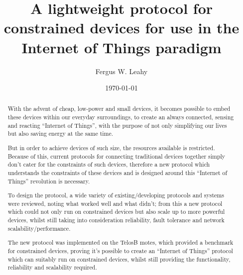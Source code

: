 \documentclass{l4proj}
\begin{document}
\title{A lightweight protocol for constrained devices for use in the Internet of Things paradigm}
\author{Fergus W. Leahy}
\date{\today}
\maketitle

\begin{abstract}
With the advent of cheap, low-power and small devices, it becomes possible to embed these devices within our everyday surroundings, to create an always connected, sensing and reacting ``Internet of Things'', with the purpose of not only simplifying our lives but also saving energy at the same time. 

But in order to achieve devices of such size, the resources available is restricted. Because of this, current protocols for connecting traditional devices together simply don't cater for the constraints of such devices, therefore a new protocol which understands the constraints of these devices and is designed around this ``Internet of Things'' revolution is necessary.

To design the protocol, a wide variety of existing/developing protocols and systems were reviewed, noting what worked well and what didn't; from this a new protocol which could not only run on constrained devices but also scale up to more powerful devices, whilst still taking into consideration reliability, fault tolerance and network scalability/performance.

The new protocol was implemented on the TelosB motes, which provided a benchmark for constrained devices, proving it's possible to create an ``Internet of Things'' protocol which can suitably run on constrained devices, whilst still providing the functionality, reliability and scalability required. 

\end{abstract}
\begin{comment}
    1) Motivation/problem statement: Why do we care about the problem? What practical, scientific, theoretical or artistic gap is your research filling?

    2) Methods/procedure/approach: What did you actually do to get your results? (e.g. analyzed 3 novels, completed a series of 5 oil paintings, interviewed 17 students)

    3) Results/findings/product: As a result of completing the above procedure, what did you learn/invent/create?

    4) Conclusion/implications: What are the larger implications of your findings, especially for the problem/gap identified in step 1?
\end{comment}
\educationalconsent
%
%
\tableofcontents
\end{document}
